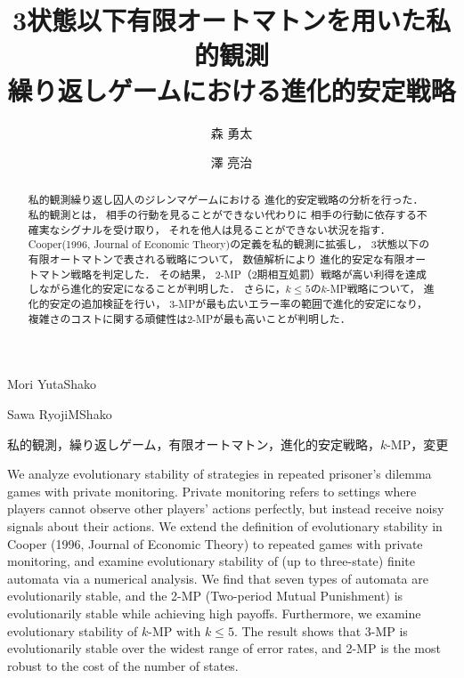 \documentclass[submit]{ipsj}
\theoremstyle{definition}
\begin{document}
\title{3状態以下有限オートマトンを用いた私的観測\\
繰り返しゲームにおける進化的安定戦略}




\author{森 勇太}{Mori Yuta}{Shako}
\author{澤 亮治}{Sawa Ryoji}{MShako}

\begin{abstract}
私的観測繰り返し囚人のジレンマゲームにおける
進化的安定戦略の分析を行った．
私的観測とは，
相手の行動を見ることができない代わりに
相手の行動に依存する不確実なシグナルを受け取り，
それを他人は見ることができない状況を指す．
Cooper(1996, Journal of Economic Theory)の定義を私的観測に拡張し，
3状態以下の有限オートマトンで表される戦略について，
数値解析により
進化的安定な有限オートマトン戦略を判定した．
その結果，
2-MP（2期相互処罰）戦略が高い利得を達成しながら進化的安定になることが判明した．
さらに，$k \le 5$の$k$-MP戦略について，
進化的安定の追加検証を行い，
3-MPが最も広いエラー率の範囲で進化的安定になり，
複雑さのコストに関する頑健性は2-MPが最も高いことが判明した．
\end{abstract}

\begin{jkeyword}
  私的観測，繰り返しゲーム，有限オートマトン，進化的安定戦略，$k$-MP，変更
\end{jkeyword}

\begin{eabstract}
We analyze evolutionary stability of strategies
in repeated prisoner's dilemma games with private monitoring.
Private monitoring refers to settings 
where players cannot observe other players' actions perfectly,
but instead receive noisy signals about their actions.
We extend the definition of evolutionary stability
in Cooper (1996, Journal of Economic Theory)
to repeated games with private monitoring, 
and examine evolutionary stability of (up to three-state) finite automata
via a numerical analysis.
We find that seven types of automata are evolutionarily stable,
and the 2-MP (Two-period Mutual Punishment) is evolutionarily stable while achieving high payoffs.
Furthermore,
we examine evolutionary stability of $k$-MP with $k \le 5$.
The result shows that
3-MP is evolutionarily stable over the widest range of error rates,
and 2-MP is the most robust to the cost of the number of states.
\end{eabstract}
\end{document}
